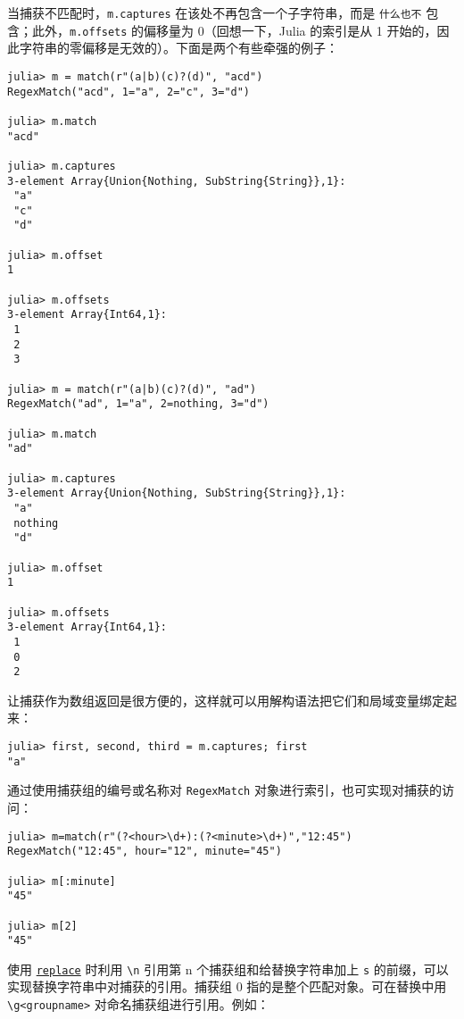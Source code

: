 当捕获不匹配时，\texttt{m.captures} 在该处不再包含一个子字符串，而是 \texttt{什么也不} 包含；此外，\texttt{m.offsets} 的偏移量为 0（回想一下，Julia 的索引是从 1 开始的，因此字符串的零偏移是无效的）。下面是两个有些牵强的例子：




\begin{verbatim}
julia> m = match(r"(a|b)(c)?(d)", "acd")
RegexMatch("acd", 1="a", 2="c", 3="d")

julia> m.match
"acd"

julia> m.captures
3-element Array{Union{Nothing, SubString{String}},1}:
 "a"
 "c"
 "d"

julia> m.offset
1

julia> m.offsets
3-element Array{Int64,1}:
 1
 2
 3

julia> m = match(r"(a|b)(c)?(d)", "ad")
RegexMatch("ad", 1="a", 2=nothing, 3="d")

julia> m.match
"ad"

julia> m.captures
3-element Array{Union{Nothing, SubString{String}},1}:
 "a"
 nothing
 "d"

julia> m.offset
1

julia> m.offsets
3-element Array{Int64,1}:
 1
 0
 2
\end{verbatim}



让捕获作为数组返回是很方便的，这样就可以用解构语法把它们和局域变量绑定起来：




\begin{verbatim}
julia> first, second, third = m.captures; first
"a"
\end{verbatim}



通过使用捕获组的编号或名称对 \texttt{RegexMatch} 对象进行索引，也可实现对捕获的访问：




\begin{verbatim}
julia> m=match(r"(?<hour>\d+):(?<minute>\d+)","12:45")
RegexMatch("12:45", hour="12", minute="45")

julia> m[:minute]
"45"

julia> m[2]
"45"
\end{verbatim}



使用 \hyperlink{17608641146794059481}{\texttt{replace}} 时利用 \texttt{{\textbackslash}n} 引用第 n 个捕获组和给替换字符串加上 \texttt{s} 的前缀，可以实现替换字符串中对捕获的引用。捕获组 0 指的是整个匹配对象。可在替换中用 \texttt{{\textbackslash}g<groupname>} 对命名捕获组进行引用。例如：




